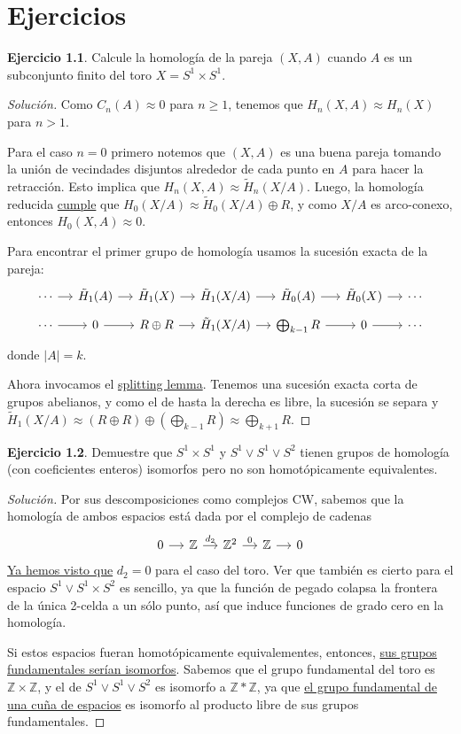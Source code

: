 \documentclass[spanish]{book}
\theoremstyle{definition}
\newtheorem*{ejer}{Ejercicio}
\newcommand{\Z}{\mathbb{Z}}
\begin{document}
\chapter{Ejercicios}
	\begin{ejer}
	Calcule la homología de la pareja $(X,A)$ cuando $A$ es un subconjunto finito del toro $X=S^1\times S^1$.
\end{ejer}
\begin{proof}[Solución]
	Como $C_n(A)\approx0$ para $n\geq1$, tenemos que $H_n(X,A)\approx H_n(X)$ para $n>1$.
	
	Para el caso $n=0$ primero notemos que $(X,A)$ es una buena pareja tomando la unión de vecindades disjuntos alrededor de cada punto en $A$ para hacer la retracción. Esto implica que $H_n(X,A)\approx \tilde{H}_n(X/A)$.  Luego, la homología reducida \hyperref[sec:6.4]{cumple} que $H_0(X/A)\approx\tilde{H}_0(X/A)\oplus R$, y como $X/A$ es arco-conexo, entonces $H_0(X,A)\approx0$.
	
	Para encontrar el primer grupo de homología usamos la sucesión exacta de la pareja:
	\[\begin{tikzcd}[column sep=small,row sep=tiny]
		\cdots\arrow[r]&\tilde{H}_1(A)\arrow[r]&\tilde{H}_1(X)\arrow[r]&\tilde{H}_1(X/A)\arrow[r]&\tilde{H}_0(A)\arrow[r]&\tilde{H}_0(X)\arrow[r]&\cdots\\
		\cdots\arrow[r]&0\arrow[r]&R\oplus R\arrow[r]&\tilde{H}_1(X/A)\arrow[r]&\bigoplus_{k-1}R\arrow[r]&0\arrow[r]&\cdots
	\end{tikzcd}\]
	donde $|A|=k$.
	
	Ahora invocamos el \hyperref[subsec:splitting]{splitting lemma}. Tenemos una sucesión exacta corta de grupos abelianos, y como el de hasta la derecha es libre, la sucesión se separa y $\tilde{H}_1(X/A)\approx (R\oplus R)\oplus\left(\bigoplus_{k-1}R\right)\approx \bigoplus_{k+1}R$.
\end{proof}
\begin{ejer}\label{ejer:homol-homot}Demuestre que $S^1 \times S^1$ y $S^1 \vee S^1 \vee S^2$ tienen grupos de homología (con coeficientes enteros) isomorfos pero no son homotópicamente equivalentes.
\begin{proof}[Solución]
	Por sus descomposiciones como complejos CW, sabemos que la homología de ambos espacios está dada por el complejo de cadenas
	\[\begin{tikzcd}[column sep=small]
		0\arrow[r]&\Z\arrow[r,"d_2"]&\Z^2\arrow[r,"0"]&\Z\arrow[r]&0
	\end{tikzcd}\]
	\hyperref[ejem:toroCW]{Ya hemos visto que} $d_2=0$ para el caso del toro. Ver que también es cierto para el espacio $S^1\vee S^1\times S^2$ es sencillo, ya que la función de pegado colapsa la frontera de la única 2-celda a un sólo punto, así que induce funciones de grado cero en la homología.
	
	Si estos espacios fueran homotópicamente equivalementes, entonces, \hyperref[1.2.1]{sus grupos fundamentales serían isomorfos}. Sabemos que el grupo fundamental del toro es $\Z\times\Z$, y el de $S^1 \vee S^1 \vee S^2$ es isomorfo a $\Z\ast\Z$, ya que \hyperref[sec:grp-fund-cuña]{el grupo fundamental de una cuña de espacios} es isomorfo al producto libre de sus grupos fundamentales.
\end{proof}
\end{ejer}
\end{document}
